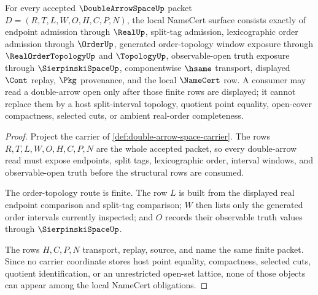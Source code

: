 \begin{theorem}
\label{thm:double-arrow-space-namecert-obligations}
For every accepted $\DoubleArrowSpaceUp$ packet $D=(R,T,L,W,O,H,C,P,N)$, the local NameCert surface consists exactly of endpoint admission through $\RealUp$, split-tag admission, lexicographic order admission through $\OrderUp$, generated order-topology window exposure through $\RealOrderTopologyUp$ and $\TopologyUp$, observable-open truth exposure through $\SierpinskiSpaceUp$, componentwise $\hsame$ transport, displayed $\Cont$ replay, $\Pkg$ provenance, and the local $\NameCert$ row. A consumer may read a double-arrow open only after those finite rows are displayed; it cannot replace them by a host split-interval topology, quotient point equality, open-cover compactness, selected cuts, or ambient real-order completeness.
\end{theorem}
\begin{proof}
Project the carrier of \autoref{def:double-arrow-space-carrier}. The rows $R,T,L,W,O,H,C,P,N$ are the whole accepted packet, so every double-arrow read must expose endpoints, split tags, lexicographic order, interval windows, and observable-open truth before the structural rows are consumed.

The order-topology route is finite. The row $L$ is built from the displayed real endpoint comparison and split-tag comparison; $W$ then lists only the generated order intervals currently inspected; and $O$ records their observable truth values through $\SierpinskiSpaceUp$.

The rows $H,C,P,N$ transport, replay, source, and name the same finite packet. Since no carrier coordinate stores host point equality, compactness, selected cuts, quotient identification, or an unrestricted open-set lattice, none of those objects can appear among the local NameCert obligations.
\end{proof}

